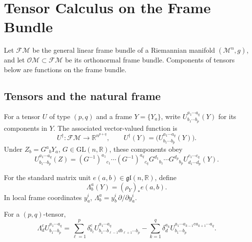 \chapter{Tensor Calculus on the Frame Bundle}
\label{app:chow-ii-frame-bundle-tensor-calculus}

Let $\mathcal F\mathcal M$ be the general linear frame
bundle of a Riemannian manifold $(\mathcal M^n,g)$, and let
$\mathcal O\mathcal M\subset\mathcal F\mathcal M$ be its orthonormal frame
bundle.  Components of tensors below are functions on the frame bundle.

\section{Tensors and the natural frame}

\begin{definition}
\label{def:chow-ii-frame-tensor-components}

For a tensor $U$ of type $(p,q)$ and a frame $Y=\{Y_a\}$, write
$U^{a_1\cdots a_q}_{b_1\cdots b_p}(Y)$ for its components in $Y$.  The
associated vector-valued function is
\[
 U^\dagger:\mathcal F\mathcal M\longrightarrow
 \mathbb R^{n^{p+q}},\qquad
 U^\dagger(Y)=\bigl(U^{a_1\cdots a_q}_{b_1\cdots b_p}(Y)\bigr).
\]
Under $Z_b=G^a{}_bY_a$, $G\in\mathrm{GL}(n,\mathbb R)$, these components obey
\[
 U^{a_1\cdots a_q}_{b_1\cdots b_p}(Z)=
 (G^{-1})^{a_1}{}_{c_1}\cdots(G^{-1})^{a_q}{}_{c_q}
 G^{d_1}{}_{b_1}\cdots G^{d_p}{}_{b_p}
 U^{c_1\cdots c_q}_{d_1\cdots d_p}(Y).
\]
\end{definition}

\begin{definition}
\label{def:chow-ii-vertical-frame-fields}

For the standard matrix unit $e(a,b)\in\mathfrak{gl}(n,\mathbb R)$, define
\[
 \Lambda^a_b(Y)=(\rho_Y)_*e(a,b).
\]
In local frame coordinates $y_a^i$,
$\Lambda^a_b=y_b^i\,\partial/\partial y_a^i$.
\end{definition}

\begin{lemma}
\label{lem:chow-ii-vertical-tensor-action}


For a $(p,q)$-tensor,
\[
 \Lambda^c_d U^{a_1\cdots a_q}_{b_1\cdots b_p}
 =\sum_{\ell=1}^p\delta^c_{b_\ell}
 U^{a_1\cdots a_q}_{b_1\cdots b_{\ell-1}d b_{\ell+1}\cdots b_p}
 -\sum_{k=1}^q\delta^{a_k}_d
 U^{a_1\cdots a_{k-1}c a_{k+1}\cdots a_q}_{b_1\cdots b_p}.
\]
\end{lemma}

